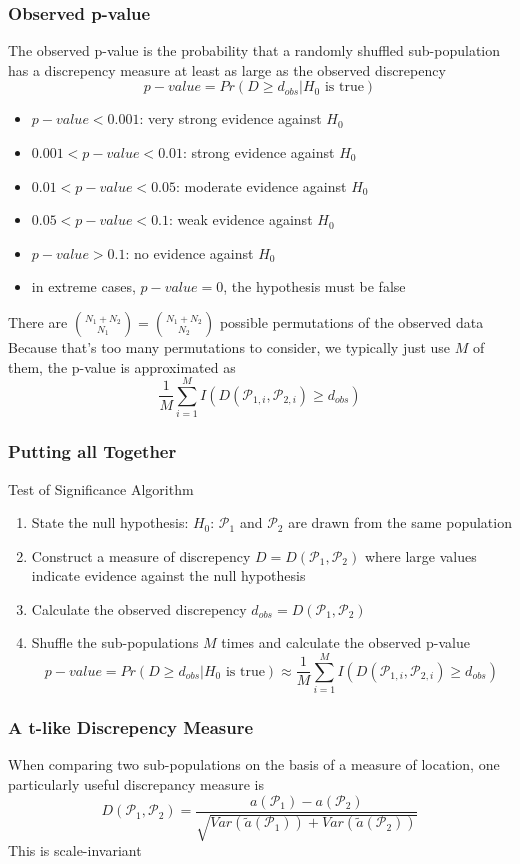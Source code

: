\documentclass[11pt]{article}
\begin{document}
\subsubsection*{Observed p-value}
The observed p-value is the probability that a randomly shuffled sub-population has a discrepency measure at least as large as the observed discrepency 
\[p-value = Pr(D\geq d_{obs}|\text{$H_0$ is true})\]
\begin{itemize}
    \item $p-value < 0.001$: very strong evidence against $H_0$
    \item $0.001 < p-value < 0.01$: strong evidence against $H_0$
    \item $0.01 < p-value < 0.05$: moderate evidence against $H_0$
    \item $0.05 < p-value < 0.1$: weak evidence against $H_0$
    \item $p-value > 0.1$: no evidence against $H_0$
    \item in extreme cases, $p-value=0$, the hypothesis must be false 
\end{itemize}
There are $\binom{N_1+N_2}{N_1} = \binom{N_1+N_2}{N_2}$ possible permutations of the observed data \\
Because that's too many permutations to consider, we typically just use $M$ of them, the p-value is approximated as 
\[\frac{1}{M}\sum_{i=1}^{M}I(D(\mathcal{P}_{1,i},\mathcal{P}_{2,i})\geq d_{obs})\]
\subsubsection*{Putting all Together}
Test of Significance Algorithm 
\begin{enumerate}
    \item State the null hypothesis: $H_0$: $\mathcal{P}_1$ and $\mathcal{P}_2$ are drawn from the same population 
    \item Construct a measure of discrepency $D=D(\mathcal{P}_1,\mathcal{P}_2)$ where large values indicate evidence against the null hypothesis 
    \item Calculate the observed discrepency $d_{obs} = D(\mathcal{P}_1,\mathcal{P}_2)$
    \item Shuffle the sub-populations $M$ times and calculate the observed p-value \[p-value = Pr(D\geq d_{obs}|\text{$H_0$ is true})\approx \frac{1}{M}\sum_{i=1}^{M}I(D(\mathcal{P}_{1,i},\mathcal{P}_{2,i})\geq d_{obs})\]
\end{enumerate}
\subsubsection{A t-like Discrepency Measure}
When comparing two sub-populations on the basis of a measure of location, one particularly useful discrepancy measure is 
\[D(\mathcal{P}_1,\mathcal{P}_2) = \frac{a(\mathcal{P}_1)-a(\mathcal{P}_2)}{\sqrt{Var(\tilde{a}(\mathcal{P}_1))+Var(\tilde{a}(\mathcal{P}_2))}}\]
This is scale-invariant 
\end{document}
